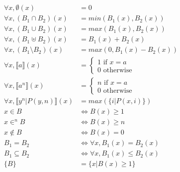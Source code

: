 \begin{mydef}
	\begin{align*}
		\forall x, \emptyset(x)  & = 0 \\
		\forall x, (B_1 \cap B_2)(x)  & = min(B_1(x),B_2(x)) \\
		\forall x, (B_1 \cup B_2)(x)  & = max(B_1(x),B_2(x)) \\
		\forall x, (B_1 \uplus B_2)(x)  & = B_1(x) + B_2(x) \\
		\forall x, (B_1 \setminus B_2)(x)  & = max(0,B_1(x) - B_2(x)) \\
		\forall x, \llbracket a \rrbracket(x) & = \left\{\begin{array}{ll}
			1 \mbox{ if } x = a \\
			0 \mbox{ otherwise}
		\end{array}\right. \\
		\forall x, \llbracket a^n \rrbracket(x) & = \left\{\begin{array}{ll}
			n \mbox{ if } x = a \\
			0 \mbox{ otherwise}
		\end{array}\right. \\
		\forall x, \llbracket y^n | P(y,n) \rrbracket(x)  & = max(\{ i | P(x,i) \}) \\
		x \in B & \iff B(x) \geq 1 \\
		x \in^n B & \iff B(x) \geq n \\
		x \notin B & \iff B(x) = 0 \\
		B_1 = B_2 &  \iff \forall x, B_1(x) = B_2(x) \\
		B_1 \subseteq B_2 &  \iff \forall x, B_1(x) \leq B_2(x) \\
		\{B\}  & = \{x | B(x) \geq 1\} \\
	\end{align*}
\end{mydef}


